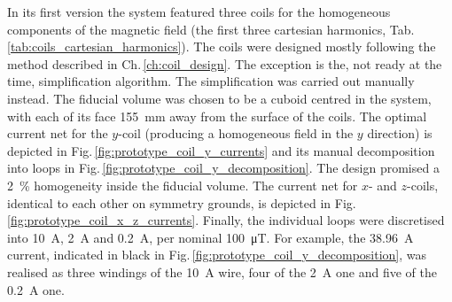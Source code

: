 In its first version the system featured three coils for the homogeneous components of the magnetic field (the first three cartesian harmonics, Tab.\,\ref{tab:coils_cartesian_harmonics}). The coils were designed mostly following the method described in Ch.\,\ref{ch:coil_design}. The exception is the, not ready at the time, simplification algorithm. The simplification was carried out manually instead. The fiducial volume was chosen to be a cuboid centred in the system, with each of its face \SI{155}{\milli\meter} away from the surface of the coils. The optimal current net for the $y$-coil (producing a homogeneous field in the $y$ direction) is depicted in Fig.\,\ref{fig:prototype_coil_y_currents} and its manual decomposition into loops in Fig.\,\ref{fig:prototype_coil_y_decomposition}. The design promised a \SI{2}{\percent} homogeneity inside the fiducial volume. The current net for $x$- and $z$-coils, identical to each other on symmetry grounds, is depicted in Fig.\,\ref{fig:prototype_coil_x_z_currents}.
Finally, the individual loops were discretised into \SI{10}{\ampere}, \SI{2}{\ampere} and \SI{0.2}{\ampere}, per nominal \SI{100}{\micro\tesla}. For example, the \SI{38.96}{\ampere} current, indicated in black in Fig.\,\ref{fig:prototype_coil_y_decomposition}, was realised as three windings of the \SI{10}{\ampere} wire, four of the \SI{2}{\ampere} one and five of the \SI{0.2}{\ampere} one.

